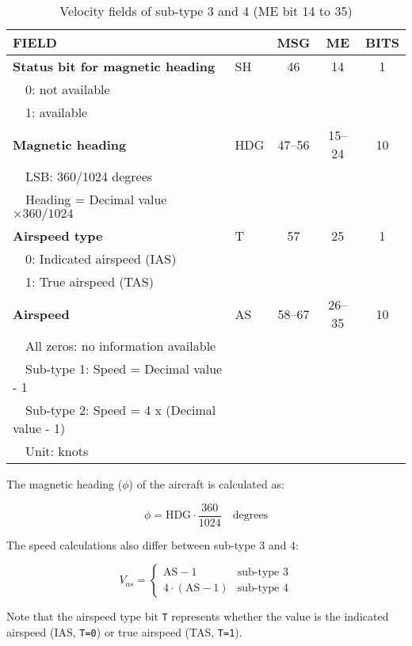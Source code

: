 \begin{table}[ht]
\caption{Velocity fields of sub-type 3 and 4 (ME bit 14 to 35)}
\label{tb:adsb-velocity-bits-14-35-as}
\footnotesize
\begin{tabular}{|l|l|c|c|c|}
\hline
\textbf{FIELD} & & \textbf{MSG} & \textbf{ME} & \textbf{BITS} \\ \hline
\textbf{Status bit for magnetic heading}  & SH & 46 & 14 & 1\\
~~0: not available &&&& \\
~~1: available &&&& \\ \hline
\textbf{Magnetic heading} & HDG & 47--56 & 15--24 & 10 \\
~~LSB: 360/1024 degrees &&&& \\
~~Heading = Decimal value $\times 360 / 1024$ &&&& \\ \hline
\textbf{Airspeed type} & T & 57 & 25 & 1\\
~~0: Indicated airspeed (IAS) &&&& \\
~~1: True airspeed (TAS) &&&& \\ \hline
\textbf{Airspeed} & AS & 58--67 & 26--35 & 10 \\
~~All zeros: no information available &&&& \\
~~Sub-type 1: Speed = Decimal value - 1 &&&& \\
~~Sub-type 2: Speed = 4 x (Decimal value - 1) &&&& \\
~~Unit: knots &&&& \\ \hline
\end{tabular}
\end{table}


The magnetic heading ($\phi$) of the aircraft is calculated as:

\begin{equation}
  \phi = \mathrm{HDG} \cdot \frac{360}{1024}  \quad \text{degrees}
\end{equation}

The speed calculations also differ between sub-type 3 and 4:

\begin{equation}
  V_{as} =
  \begin{cases}
    \mathrm{AS} - 1     & \text{sub-type 3} \\
    4 \cdot (\mathrm{AS} - 1)     & \text{sub-type 4}
  \end{cases}
\end{equation}


Note that the airspeed type bit \texttt{T} represents whether the value is the indicated airspeed (IAS, \texttt{T=0}) or true airspeed (TAS, \texttt{T=1}).

